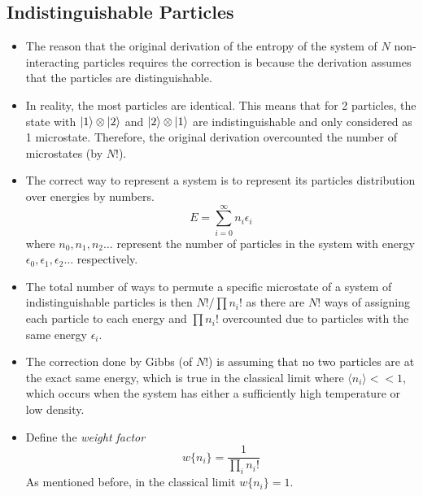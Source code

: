 \documentclass{article}
\begin{document}
\subsection{Indistinguishable Particles}
\begin{itemize}
    \item The reason that the original derivation of the entropy of the system of $N$ non-interacting particles requires the correction is because the derivation assumes that the particles are distinguishable. 
    \item In reality, the most particles are identical. This means that for 2 particles, the state with $\ket{1}\otimes\ket{2}$ and $\ket{2}\otimes\ket{1}$ are indistinguishable and only considered as 1 microstate. Therefore, the original derivation overcounted the number of microstates (by $N!$). 
    \item The correct way to represent a system is to represent its particles distribution over energies by numbers.
    \begin{equation}
        E=\sum_{i=0}^\infty n_i\epsilon_i
    \end{equation}
    where $n_0,n_1,n_2\dots$ represent the number of particles in the system with energy $\epsilon_0,\epsilon_1,\epsilon_2\dots$ respectively.
    \item The total number of ways to permute a specific microstate of a system of indistinguishable particles is then $N!/\prod n_i!$ as there are $N!$ ways of assigning each particle to each energy and $\prod n_i!$ overcounted due to particles with the same energy $\epsilon_i$.
    \item The correction done by Gibbs (of $N!$) is assuming that no two particles are at the exact same energy, which is true in the classical limit where $\langle n_i\rangle<<1$, which occurs when the system has either a sufficiently high temperature or low density.
    \item Define the \textit{weight factor}
    \begin{equation}
        w\{n_i\}=\frac{1}{\prod_in_i!}
    \end{equation}
    As mentioned before, in the classical limit $w\{n_i\}=1$. 
\end{itemize}
\end{document}
